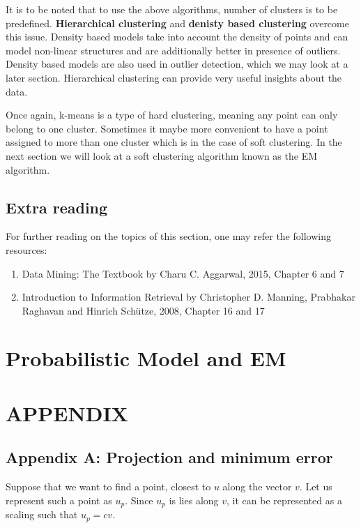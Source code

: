 \documentclass[12pt,a4paper]{article}
\begin{document}
It is to be noted that to use the above algorithms, number of clusters is to be predefined. \textbf{Hierarchical clustering} and \textbf{denisty based clustering} overcome this issue. Density based models take into account the density of points and can model non-linear structures and are additionally better in presence of outliers. Density based models are also used in outlier detection, which we may look at a later section. Hierarchical clustering can provide very useful insights about the data.


Once again, k-means is a type of hard clustering, meaning any point can only belong to one cluster. Sometimes it maybe more convenient to have a point assigned to more than one cluster which is in the case of soft clustering. In the next section we will look at a soft clustering algorithm known as the EM algorithm.

\subsection{Extra reading}
For further reading on the topics of this section, one may refer the following resources:
\begin{enumerate}
    \item Data Mining: The Textbook by Charu C. Aggarwal, 2015, Chapter 6 and 7
    \item Introduction to Information Retrieval by Christopher D. Manning, Prabhakar Raghavan and Hinrich Schütze, 2008, Chapter 16 and 17
\end{enumerate}

\newpage
\section{Probabilistic Model and EM}


\newpage
\section{APPENDIX}
\subsection{Appendix A: Projection and minimum error}
Suppose that we want to find a point, closest to $u$ along the vector $v$. Let us represent such a point as $u_p$. Since $u_p$ is lies along $v$, it can be represented as a scaling such that $u_p= cv$. 
\end{document}
